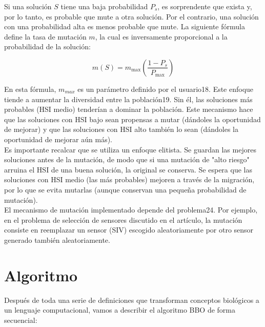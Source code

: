 \documentclass{article}
\begin{document}
Si una solución $S$ tiene una baja probabilidad $P_s$, es sorprendente que exista y, por lo tanto, es probable que mute a otra solución. Por el contrario, una solución con una probabilidad alta es menos probable que mute. La siguiente fórmula define la tasa de mutación $m$, la cual es inversamente proporcional a la probabilidad de la solución:

$$m(S) = m_{\text{max}} \left( \frac{1 - P_s}{P_{\text{max}}} \right)$$

En esta fórmula, $m_{max}$ es un parámetro definido por el usuario18. Este enfoque tiende a aumentar la diversidad entre la población19. Sin él, las soluciones más probables (HSI medio) tenderían a dominar la población. Este mecanismo hace que las soluciones con HSI bajo sean propensas a mutar (dándoles la oportunidad de mejorar) y que las soluciones con HSI alto también lo sean (dándoles la oportunidad de mejorar aún más).\\

Es importante recalcar que se utiliza un enfoque elitista. Se guardan las mejores soluciones antes de la mutación, de modo que si una mutación de "alto riesgo" arruina el HSI de una buena solución, la original se conserva. Se espera que las soluciones con HSI medio (las más probables) mejoren a través de la migración, por lo que se evita mutarlas (aunque conservan una pequeña probabilidad de mutación).\\

El mecanismo de mutación implementado depende del problema24. Por ejemplo, en el problema de selección de sensores discutido en el artículo, la mutación consiste en reemplazar un sensor (SIV) escogido aleatoriamente por otro sensor generado también aleatoriamente.


\section{Algoritmo}

Después de toda una serie de definiciones que transforman conceptos biológicos a un lenguaje computacional, vamos a describir el algoritmo BBO de forma secuencial:
\end{document}
